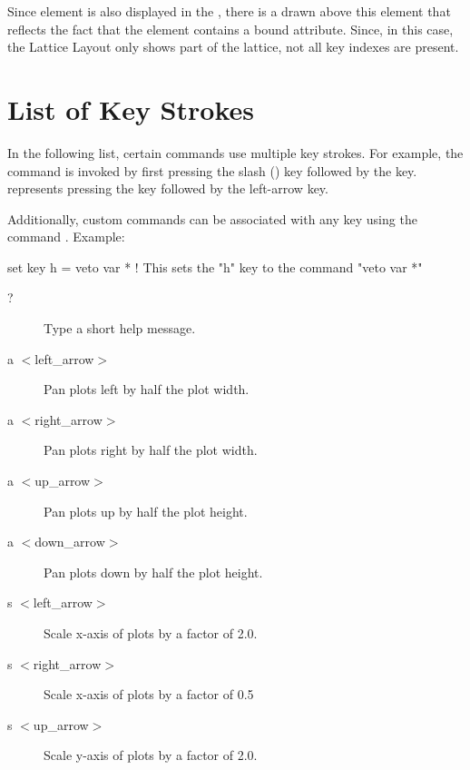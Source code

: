 {Since element  is also displayed in the , there is a  drawn
above this element that reflects the fact that the element contains a bound attribute. Since, in
this case, the Lattice Layout only shows part of the lattice, not all key indexes are present.


\section{List of Key Strokes}
\label{s:keys}

In the following list, certain commands use multiple key strokes. For example, the  command
is invoked by first pressing the slash () key followed by the  key.  represents pressing the  key followed by the left-arrow key.

Additionally, custom commands can be associated with any key using the  command
. Example:
\begin{example}
  set key h = veto var *  ! This sets the "h" key to the command "veto var *"
\end{example}

\begin{description}
\item[?]
Type a short help message.

\item[a $<$left\_arrow$>$]
Pan plots left by half the plot width.

\item[a $<$right\_arrow$>$]
Pan plots right by half the plot width.

\item[a $<$up\_arrow$>$]
Pan plots up by half the plot height.

\item[a $<$down\_arrow$>$]
Pan plots down by half the plot height.

\item[s $<$left\_arrow$>$]
Scale x-axis of plots by a factor of 2.0.

\item[s $<$right\_arrow$>$]
Scale x-axis of plots by a factor of 0.5

\item[s $<$up\_arrow$>$]
Scale y-axis of plots by a factor of 2.0.


\end{description}}
